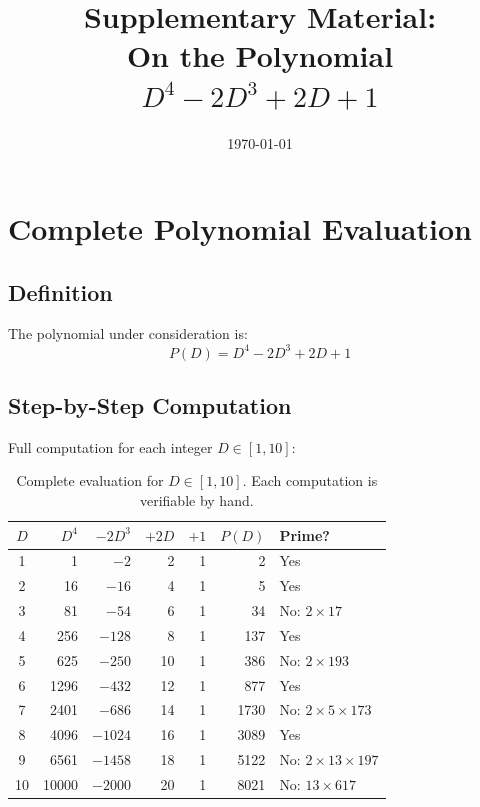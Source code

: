 \documentclass[11pt,a4paper]{article}
\title{Supplementary Material:\\On the Polynomial $D^4 - 2D^3 + 2D + 1$}
\author{}
\date{\today}
\begin{document}
\maketitle

\tableofcontents
\newpage

\section{Complete Polynomial Evaluation}

\subsection{Definition}

The polynomial under consideration is:
\begin{equation}
P(D) = D^4 - 2D^3 + 2D + 1
\end{equation}

\subsection{Step-by-Step Computation}

Full computation for each integer $D \in [1, 10]$:

\begin{table}[h]
\centering
\begin{tabular}{|c|r|r|r|r|r|l|}
\hline
$D$ & $D^4$ & $-2D^3$ & $+2D$ & $+1$ & $P(D)$ & Prime? \\
\hline
1 & 1 & $-2$ & 2 & 1 & 2 & Yes \\
2 & 16 & $-16$ & 4 & 1 & 5 & Yes \\
3 & 81 & $-54$ & 6 & 1 & 34 & No: $2 \times 17$ \\
4 & 256 & $-128$ & 8 & 1 & 137 & Yes \\
5 & 625 & $-250$ & 10 & 1 & 386 & No: $2 \times 193$ \\
6 & 1296 & $-432$ & 12 & 1 & 877 & Yes \\
7 & 2401 & $-686$ & 14 & 1 & 1730 & No: $2 \times 5 \times 173$ \\
8 & 4096 & $-1024$ & 16 & 1 & 3089 & Yes \\
9 & 6561 & $-1458$ & 18 & 1 & 5122 & No: $2 \times 13 \times 197$ \\
10 & 10000 & $-2000$ & 20 & 1 & 8021 & No: $13 \times 617$ \\
\hline
\end{tabular}
\caption{Complete evaluation for $D \in [1,10]$. Each computation is verifiable by hand.}
\end{table}
\end{document}
